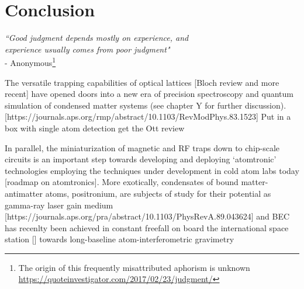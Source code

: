
\chapter{Conclusion}

\begin{flushright}
\emph{``Good judgment depends mostly on experience, and\\ experience usually comes from poor judgment"} \\- Anonymous\footnote{The origin of this frequently misattributed aphorism is unknown \url{https://quoteinvestigator.com/2017/02/23/judgment/}}
\end{flushright}



	 
	
	The versatile trapping capabilities of optical lattices [Bloch review and more recent] have opened doors into a new era of precision spectroscopy and quantum simulation of condensed matter systems (see chapter Y for further discussion). [https://journals.aps.org/rmp/abstract/10.1103/RevModPhys.83.1523]
	Put in a box with single atom detection
		get the Ott review
		
	In parallel, the miniaturization of magnetic and RF traps down to chip-scale circuits is an important step towards developing and deploying `atomtronic' technologies employing the techniques under development in cold atom labs today [roadmap on atomtronics].
	More exotically, condensates of bound matter-antimatter atoms, positronium, are subjects of study for their potential as gamma-ray laser gain medium [https://journals.aps.org/pra/abstract/10.1103/PhysRevA.89.043624]
	and BEC has recenlty been achieved in constant freefall on board the international space station [] towards long-baseline atom-interferometric gravimetry


